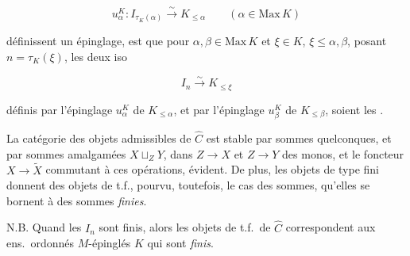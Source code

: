 \documentclass[11pt,a4paper]{article}
\begin{document}
\[
u_\alpha^K : I_{\tau_K(\alpha)} \overset{\sim}{\longrightarrow} K_{\leq \alpha}
\qquad (\alpha \in \mathrm{Max}\,K)
\]

définissent un épinglage, est que pour \struck{\ill{}} $\alpha, \beta \in
\mathrm{Max}\,K$ et $\xi \in K$, $\xi \leq \alpha, \beta$, posant
$n = \tau_K(\xi)$, les deux iso

\[
I_n \overset{\sim}{\longrightarrow} K_{\leq \xi}
\]

définis par l'épinglage  $u_\alpha^K$ de $K_{\leq \alpha}$, et
par l'épinglage $u_\beta^K$ de $K_{\leq \beta}$, soient les
.


La catégorie des objets admissibles de $\widehat{C}$ est stable par
  sommes quelconques, et par sommes
amalgamées $X \sqcup_Z Y$, dans $Z \to X$ et $Z \to Y$ des monos, et
 le foncteur $X \longrightarrow \widetilde{X}$ commutant à ces
opérations,  évident. De plus, les objets de type fini
donnent des objets de t.f., pourvu, toutefois,  le cas des sommes,
qu'elles se bornent à des sommes \emph{finies}.


N.B. Quand les $I_n$ sont finis, alors les objets  de t.f.\ de
$\widehat{C}$ \struck{\ill{}} correspondent aux ens.\ ordonnés
$M$-épinglés $K$ qui sont \emph{finis}.
\end{document}
